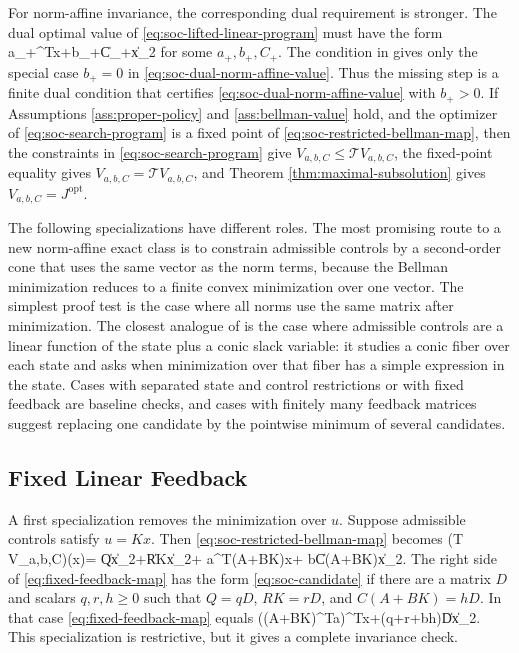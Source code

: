 \documentclass{article}
\begin{document}
For norm-affine invariance, the corresponding dual requirement is stronger. The dual optimal value of \eqref{eq:soc-lifted-linear-program} must have the form
\BEQ
 a_+^Tx+b_+\|C_+x\|_2
\label{eq:soc-dual-norm-affine-value}
\EEQ
for some $a_+,b_+,C_+$. The condition in \cite{pates-rantzer-cdc} gives only the special case $b_+=0$ in \eqref{eq:soc-dual-norm-affine-value}. Thus the missing step is a finite dual condition that certifies \eqref{eq:soc-dual-norm-affine-value} with $b_+>0$. If Assumptions \ref{ass:proper-policy} and \ref{ass:bellman-value} hold, and the optimizer of \eqref{eq:soc-search-program} is a fixed point of \eqref{eq:soc-restricted-bellman-map}, then the constraints in \eqref{eq:soc-search-program} give $V_{a,b,C}\leq\mathcal T V_{a,b,C}$, the fixed-point equality gives $V_{a,b,C}=\mathcal T V_{a,b,C}$, and Theorem \ref{thm:maximal-subsolution} gives $V_{a,b,C}=J^\textrm{opt}$.

The following specializations have different roles. The most promising route to a new norm-affine exact class is to constrain admissible controls by a second-order cone that uses the same vector as the norm terms, because the Bellman minimization reduces to a finite convex minimization over one vector. The simplest proof test is the case where all norms use the same matrix after minimization. The closest analogue of \cite{pates-rantzer-cdc} is the case where admissible controls are a linear function of the state plus a conic slack variable: it studies a conic fiber over each state and asks when minimization over that fiber has a simple expression in the state. Cases with separated state and control restrictions or with fixed feedback are baseline checks, and cases with finitely many feedback matrices suggest replacing one candidate by the pointwise minimum of several candidates.

\subsection{Fixed Linear Feedback}

A first specialization removes the minimization over $u$. Suppose admissible controls satisfy $u=Kx$. Then \eqref{eq:soc-restricted-bellman-map} becomes
\BEQ
(\mathcal T V_{a,b,C})(x)=
\|Qx\|_2+\|RKx\|_2+
\gamma a^T(A+BK)x+
\gamma b\|C(A+BK)x\|_2.
\label{eq:fixed-feedback-map}
\EEQ
The right side of \eqref{eq:fixed-feedback-map} has the form \eqref{eq:soc-candidate} if there are a matrix $D$ and scalars $q,r,h\geq0$ such that $Q=qD$, $RK=rD$, and $C(A+BK)=hD$. In that case \eqref{eq:fixed-feedback-map} equals
\BEQ
\gamma ((A+BK)^Ta)^Tx+(q+r+\gamma bh)\|Dx\|_2.
\label{eq:fixed-feedback-common-factor}
\EEQ
This specialization is restrictive, but it gives a complete invariance check.
\end{document}
